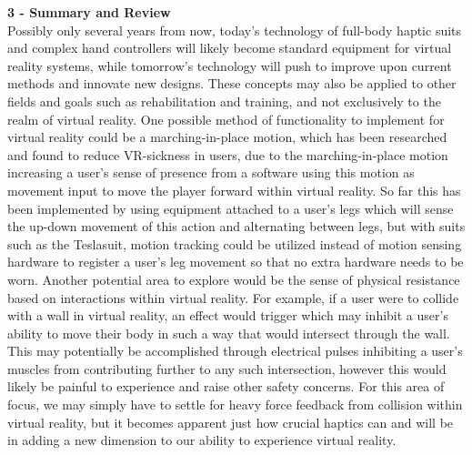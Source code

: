 \documentclass{article}
\begin{document}
\textbf{3 - Summary and Review} \\
Possibly only several years from now, today's technology of full-body haptic suits and complex hand controllers will likely become standard equipment for virtual reality systems, while tomorrow's technology will push to improve upon current methods and innovate new designs. These concepts may also be applied to other fields and goals such as rehabilitation and training, and not exclusively to the realm of virtual reality. One possible method of functionality to implement for virtual reality could be a marching-in-place motion, which has been researched\cite{article7cite} and found to reduce VR-sickness in users, due to the marching-in-place motion increasing a user's sense of presence from a software using this motion as movement input to move the player forward within virtual reality. So far this has been implemented by using equipment attached to a user's legs which will sense the up-down movement of this action and alternating between legs, but with suits such as the Teslasuit, motion tracking could be utilized instead of motion sensing hardware to register a user's leg movement so that no extra hardware needs to be worn. Another potential area to explore would be the sense of physical resistance based on interactions within virtual reality. For example, if a user were to collide with a wall in virtual reality, an effect would trigger which may inhibit a user's ability to move their body in such a way that would intersect through the wall. This may potentially be accomplished through electrical pulses inhibiting a user's muscles from contributing further to any such intersection, however this would likely be painful to experience and raise other safety concerns. For this area of focus, we may simply have to settle for heavy force feedback from collision within virtual reality, but it becomes apparent just how crucial haptics can and will be in adding a new dimension to our ability to experience virtual reality.



\end{document}
